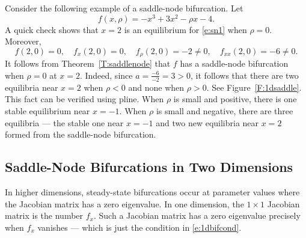 \documentclass{ximera}
\begin{document}
Consider the following example of a saddle-node bifurcation.  Let 
\begin{equation}  \label{e:sn1}
f(x,\rho) = -x^3 + 3x^2 - \rho x - 4.
\end{equation}
A quick check shows that $x=2$ is an equilibrium for \eqref{e:sn1} 
when $\rho=0$.  Moreover, 
\[
f(2,0)=0, \quad f_x(2,0)=0, \quad f_\rho(2,0)=-2\neq 0, 
\quad f_{xx}(2,0)=-6\neq 0.
\]
It follows from Theorem~\ref{T:saddlenode} that $f$ has a saddle-node
bifurcation when $\rho=0$ at $x=2$.  Indeed, since $a=\frac{-6}{-2}=3>0$, 
it follows that there are two equilibria near $x=2$ when $\rho<0$ and 
none when $\rho>0$.  See Figure~\ref{F:1dsaddle}. This fact can be 
verified using {\sf pline}.  When $\rho$ is small and positive, there is 
one stable equilibrium near $x=-1$.  When $\rho$ is small and negative, there 
are three equilibria --- the stable one near $x=-1$ and two new equilibria 
near $x=2$ formed from the saddle-node bifurcation.  



\subsection*{Saddle-Node Bifurcations in Two Dimensions}

In higher dimensions, steady-state bifurcations occur at parameter 
values where the Jacobian matrix
has a zero eigenvalue.  In one dimension,
the $1\times 1$ Jacobian matrix is the number $f_x$.  Such a 
Jacobian matrix has a zero eigenvalue precisely when $f_x$ vanishes
--- which is just the condition in \eqref{e:1dbifcond}.  
\end{document}
